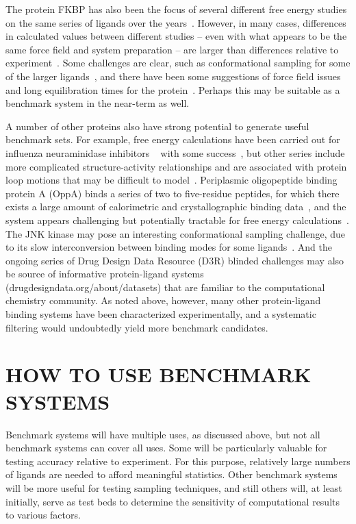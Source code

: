 \documentclass[aps,pre,twocolumn,nofootinbib,superscriptaddress,10pt, final,tightenlines]{revtex4-1}
\begin{document}
The protein FKBP has also been the focus of several different free energy studies on the same series of ligands over the years~\cite{shirts_calculating_2004, fujitani_direct_2005, jayachandran_parallelized-over-parts_2006, lee_calculation_2006, wang_absolute_2006, fujitani_massively_2009, ytreberg_absolute_2009}. 
However, in many cases, differences in calculated values between different studies -- even with what appears to be the same force field and system preparation -- are larger than differences relative to experiment~\cite{fujitani_direct_2005, jayachandran_parallelized-over-parts_2006}. 
Some challenges are clear, such as conformational sampling for some of the larger ligands~\cite{shirts_calculating_2004}, and there have been some suggestions of force field issues and long equilibration times for the protein~\cite{fujitani_massively_2009}. 
Perhaps this may be suitable as a benchmark system in the near-term as well. 

A number of other proteins also have strong potential to generate useful benchmark sets. For example, free energy calculations have been carried out for influenza neuraminidase inhibitors ~\cite{smith_dihydropyrancarboxamides_1998} with some success~\cite{michel_protein_2006}, but other series include more complicated structure-activity relationships and are associated with protein loop motions that may be difficult to model~\cite{kerry_structural_2013}. 
Periplasmic oligopeptide binding protein A (OppA) binds a series of two to five-residue peptides, for which there exists a large amount of calorimetric and crystallographic binding data~\cite{tame_crystal_1995, davies_relating_1999, sleigh_crystallographic_1999}, and the system appears challenging but potentially tractable for free energy calculations~\cite{maurer_calculation_2016}. 
The JNK kinase may pose an interesting conformational sampling challenge, due to its slow interconversion between binding modes for some ligands~\cite{kaus_how_2015}. 
And the ongoing series of Drug Design Data Resource (D3R) \cite{Gathiaka:2016:JComputAidedMolDes} blinded challenges may also be source of informative protein-ligand systems (drugdesigndata.org/about/datasets) that are familiar to the computational chemistry community. 
As noted above, however, many other protein-ligand binding systems have been characterized experimentally, and a systematic filtering would undoubtedly yield more benchmark candidates.

\section{HOW TO USE BENCHMARK SYSTEMS}
Benchmark systems will have multiple uses, as discussed above, but not all benchmark systems can cover all uses. 
Some will be particularly valuable for testing accuracy relative to experiment. 
For this purpose, relatively large numbers of ligands are needed to afford meaningful statistics. 
Other benchmark systems will be more useful for testing sampling techniques, and still others will, at least initially, serve as test beds to determine the sensitivity of computational results to various factors.
\end{document}
